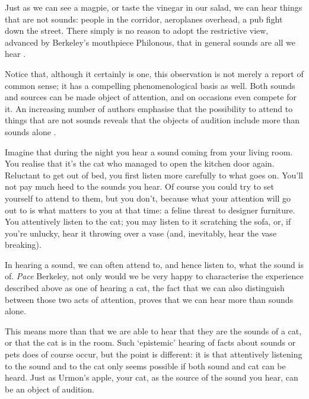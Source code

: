 \documentclass[sloppy, journal, git, anonymise, dodraft]{humapap}
\begin{document}
Just as we can see a magpie, or taste the vinegar in our salad, we can
hear things that are not sounds: people in the corridor, aeroplanes
overhead, a pub fight down the street. There simply is no reason to
adopt the restrictive view, advanced by Berkeley's mouthpiece Philonous,
that in general sounds are all we hear \autocite{berkeley1954aa}.

Notice that, although it certainly is one, this observation is not
merely a report of common sense; it has a compelling phenomenological
basis as well. Both sounds and sources can be made object of attention,
and on occasions even compete for it. An increasing number of authors
emphasise that the possibility to attend to things that are not sounds
reveals that the objects of audition include more than sounds alone
\autocite[See:][]{ocallaghan2009aa}.

Imagine that during the night you hear a sound coming from your living
room. You realise that it's the cat who managed to open the kitchen door
again. Reluctant to get out of bed, you first listen more carefully to
what goes on. You'll not pay much heed to the sounds you hear. Of course
you could try to set yourself to attend to them, but you don't, because
what your attention will go out to is what matters to you at that time:
a feline threat to designer furniture. You attentively listen to the
cat; you may listen to it scratching the sofa, or, if you're unlucky,
hear it throwing over a vase (and, inevitably, hear the vase breaking).

In hearing a sound, we can often attend to, and hence listen to, what
the sound is of. \emph{Pace} Berkeley, not only would we be very happy
to characterise the experience described above as one of hearing a cat,
the fact that we can also distinguish between those two acts of
attention, proves that we can hear more than sounds alone.

This means more than that we are able to hear that they are the sounds
of a cat, or that the cat is in the room. Such `epistemic' hearing of
facts about sounds or pets does of course occur, but the point is
different: it is that attentively listening to the sound and to the cat
only seems possible if both sound and cat can be heard. Just as Urmon's
apple, your cat, as the source of the sound you hear, can be an object
of audition.
\end{document}

